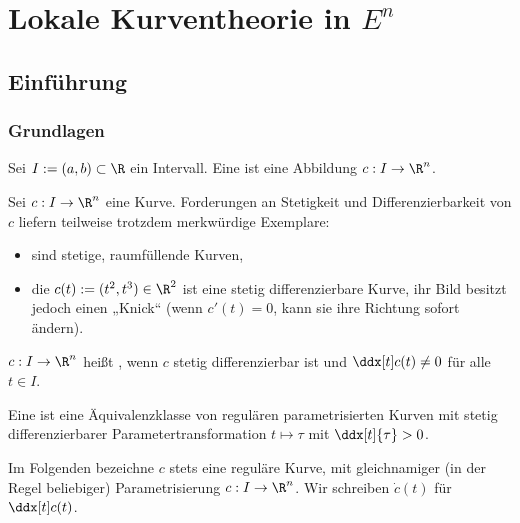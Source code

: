 \chapter{Lokale Kurventheorie in $E^n$}

\section{Einführung}

\subsection{Grundlagen}

\begin{df}
	Sei $I := (a, b) \subset \R$ ein Intervall.
	Eine  ist eine Abbildung $c: I \to \R^n$.
\end{df}

\begin{ex}
	Sei $c: I \to \R^n$ eine Kurve.
	Forderungen an Stetigkeit und Differenzierbarkeit von $c$ liefern teilweise trotzdem merkwürdige Exemplare:
	\begin{itemize}
		\item
			 sind stetige, raumfüllende Kurven,
		\item
			die  $c(t) := (t^2, t^3) \in \R^2$ ist eine stetig differenzierbare Kurve, ihr Bild besitzt jedoch einen „Knick“ (wenn $c'(t) = 0$, kann sie ihre Richtung sofort ändern).
	\end{itemize}
\end{ex}

\begin{df}
	$c: I \to \R^n$ heißt , wenn $c$ stetig differenzierbar ist und $\ddx[t] c(t) \neq 0$ für alle $t \in I$.

	Eine  ist eine Äquivalenzklasse von regulären parametrisierten Kurven mit stetig differenzierbarer Parametertransformation $t \mapsto \tau$ mit $\ddx[t]{\tau} > 0$.
\end{df}

\begin{conv}
	Im Folgenden bezeichne $c$ stets eine reguläre Kurve, mit gleichnamiger (in der Regel beliebiger) Parametrisierung $c: I \to \R^n$.
	Wir schreiben $\dot c(t)$ für $\ddx[t] c(t)$.
\end{conv}

